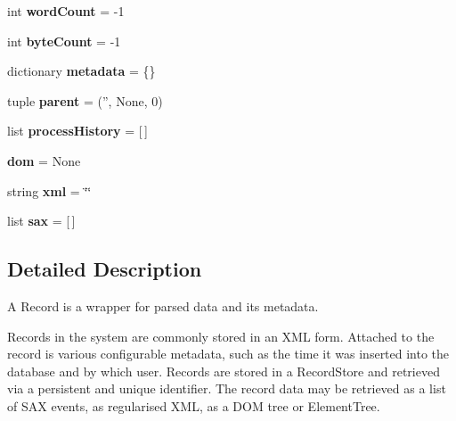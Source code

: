 \begin{DoxyCompactItemize}
\item 
\hypertarget{classcheshire3_1_1base_objects_1_1_record_a988bd94032e73ec16d1c02f809048f8e}{int {\bfseries word\-Count} = -\/1}\label{classcheshire3_1_1base_objects_1_1_record_a988bd94032e73ec16d1c02f809048f8e}

\item 
\hypertarget{classcheshire3_1_1base_objects_1_1_record_a2a55e969d93c80ea21de989b922cfcf0}{int {\bfseries byte\-Count} = -\/1}\label{classcheshire3_1_1base_objects_1_1_record_a2a55e969d93c80ea21de989b922cfcf0}

\item 
\hypertarget{classcheshire3_1_1base_objects_1_1_record_a29f68d089e2242892f8bf80dfe660a24}{dictionary {\bfseries metadata} = \{\}}\label{classcheshire3_1_1base_objects_1_1_record_a29f68d089e2242892f8bf80dfe660a24}

\item 
\hypertarget{classcheshire3_1_1base_objects_1_1_record_ac56c08be3c9c354d917a97a5d649a3a4}{tuple {\bfseries parent} = ('', None, 0)}\label{classcheshire3_1_1base_objects_1_1_record_ac56c08be3c9c354d917a97a5d649a3a4}

\item 
\hypertarget{classcheshire3_1_1base_objects_1_1_record_ab2b18c196d6e3cd67c6cc692f80616e5}{list {\bfseries process\-History} = \mbox{[}$\,$\mbox{]}}\label{classcheshire3_1_1base_objects_1_1_record_ab2b18c196d6e3cd67c6cc692f80616e5}

\item 
\hypertarget{classcheshire3_1_1base_objects_1_1_record_a174c3be3c93bce005e3e7ed059550f60}{{\bfseries dom} = None}\label{classcheshire3_1_1base_objects_1_1_record_a174c3be3c93bce005e3e7ed059550f60}

\item 
\hypertarget{classcheshire3_1_1base_objects_1_1_record_af69080e47a0d58e781c9911154b04704}{string {\bfseries xml} = \char`\"{}\char`\"{}}\label{classcheshire3_1_1base_objects_1_1_record_af69080e47a0d58e781c9911154b04704}

\item 
\hypertarget{classcheshire3_1_1base_objects_1_1_record_af760c8e5e6b6dfe7d0c3d49e8721074e}{list {\bfseries sax} = \mbox{[}$\,$\mbox{]}}\label{classcheshire3_1_1base_objects_1_1_record_af760c8e5e6b6dfe7d0c3d49e8721074e}

\end{DoxyCompactItemize}


\subsection{Detailed Description}
\begin{DoxyVerb}A Record is a wrapper for parsed data and its metadata.

Records in the system are commonly stored in an XML form. Attached to the 
record is various configurable metadata, such as the time it was inserted 
into the database and by which user. Records are stored in a RecordStore 
and retrieved via a persistent and unique identifier. The record data may 
be retrieved as a list of SAX events, as regularised XML, as a DOM tree or 
ElementTree.
\end{DoxyVerb}
 

